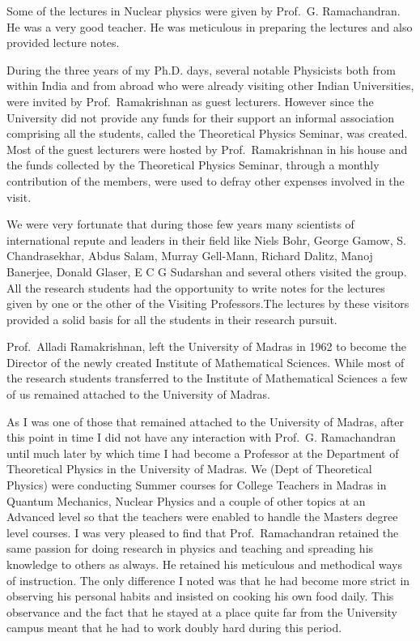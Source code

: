 Some of the lectures in Nuclear physics were given by Prof.\ G. Ramachandran. He was a very good teacher. He was meticulous in preparing the lectures and also provided lecture notes. 

During the three years of my Ph.D. days, several notable Physicists both from within India and from abroad who were already visiting other Indian Universities, were invited  by Prof.\ Ramakrishnan as guest lecturers. However since the University did not provide any funds for their support an informal association comprising all the students, called the Theoretical Physics Seminar, was created. Most of the guest lecturers were hosted by Prof.\ Ramakrishnan in his house and the funds collected by the Theoretical Physics Seminar, through a monthly contribution of the members,  were used to defray other expenses involved in the visit.

We were very fortunate that during those few years many scientists of international repute and leaders in their field like Niels Bohr, George Gamow, S. Chandrasekhar, Abdus Salam, Murray Gell-Mann, Richard Dalitz, Manoj Banerjee, Donald Glaser, E C G Sudarshan and several others visited the group. All the research students had  the opportunity to write notes for the lectures given by one or the other of the Visiting Professors.The lectures by these visitors provided a solid basis for all the students in their research pursuit. 

Prof.\ Alladi Ramakrishnan, left the University of Madras in 1962 to become  the Director of the newly created Institute of Mathematical Sciences. While most of the research students transferred to the Institute of Mathematical Sciences a few of us remained attached to the University of Madras.

As I was one of those that remained attached to the University of  Madras, after this point in time I did not have any interaction with Prof.\ G. Ramachandran until much later by which time I had become a Professor at the Department of Theoretical Physics in the University of Madras. We (Dept of Theoretical Physics) were conducting Summer courses for College Teachers in Madras in Quantum Mechanics, Nuclear Physics and a couple of other topics at an Advanced level so that the teachers were enabled to handle the Masters degree level courses. I was very pleased to find that Prof.\ Ramachandran retained the same passion for doing research in physics and teaching and spreading his knowledge to others as always. He retained his meticulous and methodical ways of instruction. The only difference I noted was that he had become more strict in observing his personal habits and insisted on cooking his own food daily. This observance and the fact that he stayed at a place quite far from the University campus meant that he had to work doubly hard during this period. 

